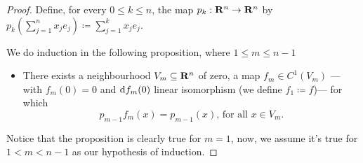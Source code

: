 \begin{proof}
    Define, for every \(0 \leq k \leq n\), the map \(p_k: \mathbf{R}^n \to \mathbf{R}^n\) by
    \(p_k(\sum_{j=1}^n x_j e_j) \coloneq \sum_{j=1}^k x_j e_j\).

    We do induction in the following proposition, where \(1 \leq m \leq n - 1\)
    \begin{itemize}\setlength\itemsep{0em}
        \item There exists a neighbourhood \(V_m \subseteq \mathbf{R}^n\) of zero, a map \(f_m
              \in C^1(V_m)\) --- with \(f_m(0) = 0\) and \(\mathrm{d} f_m(0)\) linear
              isomorphism (we define \(f_1 \coloneq f\))--- for which
              \[
                  p_{m-1} f_m(x) = p_{m-1}(x)\text{, for all } x \in V_m.
              \]
    \end{itemize}
    Notice that the proposition is clearly true for \(m = 1\), now, we assume
    it's true for \(1 < m < n - 1\) as our hypothesis of induction.


\end{proof}
